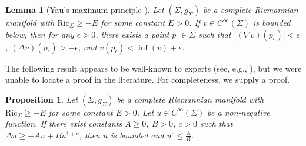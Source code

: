 \documentclass[11pt]{article}
\newtheorem{prop}[thm]{Proposition}
\newtheorem{lem}[thm]{Lemma}
\theoremstyle{definition}
\numberwithin{equation}{section}
\begin{document}
\begin{lem}[Yau's maximum principle \cite{yau1975harmonic}] \label{lem:YauMax} Let $(\Sigma, g_\Sigma)$ be a complete Riemannian manifold with $\mathrm{Ric}_\Sigma \geq -E$ for some constant $E > 0$.  If $v \in C^\infty(\Sigma)$ is bounded below, then for any $\epsilon > 0$, there exists a point $p_\epsilon \in \Sigma$ such that $|(\nabla v)(p_\epsilon)| < \epsilon$, $(\Delta v)(p_\epsilon) > -\epsilon$, and $v(p_\epsilon) < \inf(v) + \epsilon$.
\end{lem}

\indent The following result appears to be well-known to experts (see, e.g., \cite[Corollary 3.9]{albanese2017schwarz}), but we were unable to locate a proof in the literature.  For completeness, we supply a proof.

\begin{prop} \label{prop:MaximumArgument} Let $(\Sigma, g_\Sigma)$ be a complete Riemannian manifold with $\mathrm{Ric}_\Sigma \geq -E$ for some constant $E > 0$.  Let $u \in C^\infty(\Sigma)$ be a non-negative function. If there exist constants $A \geq 0$, $B > 0$, $c > 0$ such that
$\Delta u \geq -Au + Bu^{1+c}$, then $u$ is bounded and $u^c \leq \frac{A}{B}$. 
\end{prop}
\end{document}

